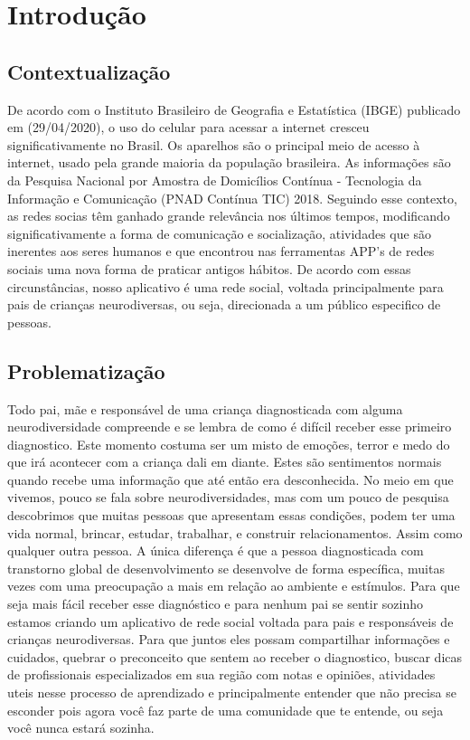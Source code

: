 

\chapter{Introdução}


\section{Contextualização}

De acordo com o Instituto Brasileiro de Geografia e Estatística (IBGE)  publicado em (29/04/2020), o uso do celular para acessar a internet cresceu significativamente no Brasil. Os aparelhos são o principal meio de acesso à internet, usado pela grande maioria da população brasileira.  As informações são da Pesquisa Nacional por Amostra de Domicílios Contínua - Tecnologia da Informação e Comunicação (PNAD Contínua TIC) 2018. Seguindo esse contexto, as  redes socias têm ganhado grande relevância nos últimos tempos, modificando significativamente a forma de comunicação e socialização, atividades que são inerentes aos seres humanos e que encontrou nas ferramentas APP’s de redes sociais uma nova forma de praticar antigos hábitos. De acordo com essas circunstâncias, nosso aplicativo é uma rede social, voltada principalmente para pais de crianças neurodiversas, ou seja, direcionada a um público especifico de pessoas.

\section{Problematização}

Todo pai, mãe e responsável de uma criança diagnosticada com alguma neurodiversidade compreende e se lembra de como é difícil receber esse primeiro diagnostico. Este momento costuma ser um misto de emoções, terror e medo do que irá acontecer com a criança dali em diante. Estes são sentimentos normais quando recebe uma informação que até então era desconhecida.
No meio em que vivemos, pouco se fala sobre neurodiversidades, mas com um pouco de pesquisa descobrimos que muitas pessoas que apresentam essas condições, podem ter uma vida normal, brincar, estudar, trabalhar, e construir relacionamentos. Assim como qualquer outra pessoa. A única diferença é que a pessoa diagnosticada com transtorno global de desenvolvimento se desenvolve de forma específica, muitas vezes com uma preocupação a mais em relação ao ambiente e estímulos.
Para que seja mais fácil receber esse diagnóstico e para nenhum pai se sentir sozinho estamos criando um aplicativo de rede social voltada para pais e responsáveis de crianças neurodiversas. Para que juntos eles possam compartilhar informações e cuidados, quebrar o preconceito que sentem ao receber o diagnostico, buscar dicas de profissionais especializados em sua região com notas e opiniões, atividades uteis nesse processo de aprendizado e principalmente entender que não precisa se esconder pois agora você faz parte de uma comunidade que te entende, ou seja você nunca estará sozinha.



